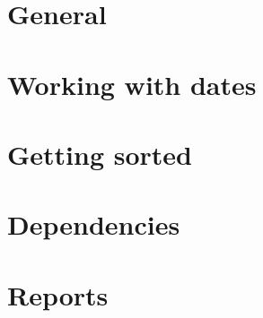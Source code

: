 \documentclass[t,handout]{beamer}
\begin{document}

\section{General}


\section{Working with dates}


\section{Getting sorted}


\section{Dependencies}


\section{Reports}

\end{document}

